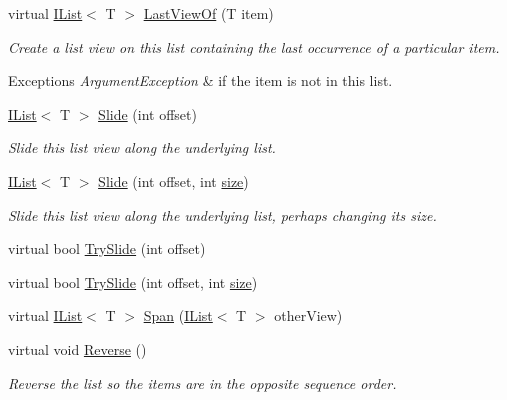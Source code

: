 \begin{DoxyCompactItemize}
virtual \hyperlink{interface_c5_1_1_i_list}{I\+List}$<$ T $>$ \hyperlink{class_c5_1_1_hashed_linked_list_a3c61023f5a2ea2c6011b35dff34f4058}{Last\+View\+Of} (T item)
\begin{DoxyCompactList}\small\item\em Create a list view on this list containing the last occurrence of a particular item. 
\begin{DoxyExceptions}{Exceptions}
{\em Argument\+Exception} & if the item is not in this list. \\
\hline
\end{DoxyExceptions}
\end{DoxyCompactList}\item 
\hyperlink{interface_c5_1_1_i_list}{I\+List}$<$ T $>$ \hyperlink{class_c5_1_1_hashed_linked_list_ac53f2d792ff731a9e088c64c6c83a20c}{Slide} (int offset)
\begin{DoxyCompactList}\small\item\em Slide this list view along the underlying list. \end{DoxyCompactList}\item 
\hyperlink{interface_c5_1_1_i_list}{I\+List}$<$ T $>$ \hyperlink{class_c5_1_1_hashed_linked_list_acc3a108d2be072d5f3e83e96c80ff3c6}{Slide} (int offset, int \hyperlink{class_c5_1_1_collection_base_ab524b118754a5a8290b6528511272833}{size})
\begin{DoxyCompactList}\small\item\em Slide this list view along the underlying list, perhaps changing its size. \end{DoxyCompactList}\item 
virtual bool \hyperlink{class_c5_1_1_hashed_linked_list_a5b6ca6ab869f08c519ed94b8b5187eb9}{Try\+Slide} (int offset)
\item 
virtual bool \hyperlink{class_c5_1_1_hashed_linked_list_a8be27e432be4b0707f55c469794afec2}{Try\+Slide} (int offset, int \hyperlink{class_c5_1_1_collection_base_ab524b118754a5a8290b6528511272833}{size})
\item 
virtual \hyperlink{interface_c5_1_1_i_list}{I\+List}$<$ T $>$ \hyperlink{class_c5_1_1_hashed_linked_list_a50badd5da340247829b46327285e5d46}{Span} (\hyperlink{interface_c5_1_1_i_list}{I\+List}$<$ T $>$ other\+View)
\item 
virtual void \hyperlink{class_c5_1_1_hashed_linked_list_a1390f0566000923c714fe19d1d2792d3}{Reverse} ()
\begin{DoxyCompactList}\small\item\em Reverse the list so the items are in the opposite sequence order. \end{DoxyCompactList}\item 

\end{DoxyCompactItemize}
